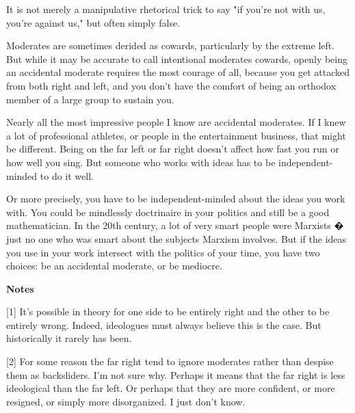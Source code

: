 It
                  is not merely a manipulative rhetorical trick to say "if
                  you're not with us, you're against us," but often simply
                  false.

Moderates are sometimes derided as cowards,
                  particularly by the extreme left. But while it may be accurate
                  to call intentional moderates cowards, openly being an
                  accidental moderate requires the most courage of all, because
                  you get attacked from both right and left, and you don't have
                  the comfort of being an orthodox member of a large group to
                  sustain you.

Nearly all the most impressive people
                  I know are accidental moderates. If I knew a lot of
                  professional athletes, or people in the entertainment
                  business, that might be different. Being on the far left or
                  far right doesn't affect how fast you run or how well you
                  sing. But someone who works with ideas has to be
                  independent-minded to do it well.

Or more
                  precisely, you have to be independent-minded about the ideas
                  you work with. You could be mindlessly doctrinaire in your
                  politics and still be a good mathematician. In the 20th
                  century, a lot of very smart people were Marxists � just no
                  one who was smart about the subjects Marxism involves. But if
                  the ideas you use in your work intersect with the politics of
                  your time, you have two choices: be an accidental moderate, or
                  be mediocre.











\textbf{Notes}

[1] It's possible in theory for one side to be
                  entirely right and the other to be entirely wrong. Indeed,
                  ideologues must always believe this is the case. But
                  historically it rarely has been.

[2] For some
                  reason the far right tend to ignore moderates rather than
                  despise them as backsliders. I'm not sure why. Perhaps it
                  means that the far right is less ideological than the far
                  left. Or perhaps that they are more confident, or more
                  resigned, or simply more disorganized. I just don't know.

